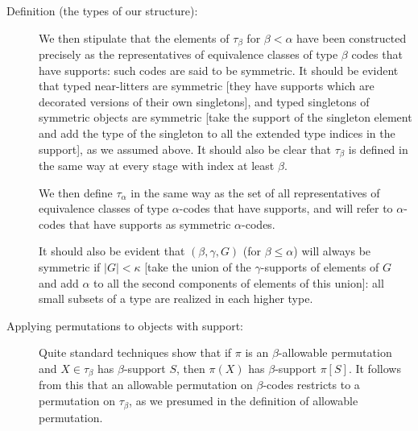 \documentclass[112pt]{article}
\begin{document}
\begin{description}
\item[Definition (the types of our structure):]  We then stipulate that the elements of $\tau_\beta$  for $\beta <\alpha$ have been constructed precisely as the representatives of equivalence classes of type $\beta$ codes that have supports:  such codes are said to be symmetric.  It should be evident that typed near-litters are symmetric [they have supports which are decorated versions of their own singletons], and typed singletons of symmetric objects are symmetric [take the support of the singleton element and add the type of the singleton to all the extended type indices in the support], as we assumed above.   It should also be clear that $\tau_\beta$ is defined in the same way at every stage with index at least $\beta$.

We then define $\tau_\alpha$ in the same way as the set of all representatives of equivalence classes of type $\alpha$-codes that have supports, and will refer to $\alpha$-codes that have supports as symmetric $\alpha$-codes.

It should also be evident that $(\beta,\gamma,G)$ (for $\beta\leq \alpha$) will always be symmetric if $|G|<\kappa$ [take the union of the $\gamma$-supports of elements of $G$ and add $\alpha$ to all the second components of elements of this union]:  all small subsets of a type are realized in each higher type.

\item[Applying permutations to objects with support:]  Quite standard techniques show that if $\pi$ is an $\beta$-allowable permutation and $X \in \tau_\beta$ has $\beta$-support $S$, then $\pi(X)$ has $\beta$-support $\pi[S]$.   It follows from this that an allowable permutation on $\beta$-codes restricts to a permutation on $\tau_\beta$, as we presumed in the definition of allowable permutation.




\end{description}
\end{document}
